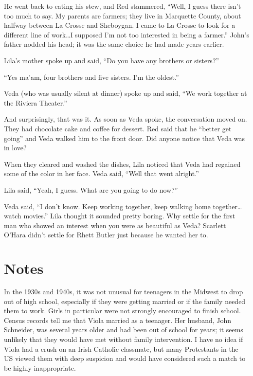 \documentclass[
  letterpaper,
]{book}
\begin{document}
He went back to eating his stew, and Red stammered, ``Well, I guess
there isn't too much to say. My parents are farmers; they live in
Marquette County, about halfway between La Crosse and Sheboygan. I came
to La Crosse to look for a different line of work\ldots I supposed I'm
not too interested in being a farmer.'' John's father nodded his head;
it was the same choice he had made years earlier.

Lila's mother spoke up and said, ``Do you have any brothers or
sisters?''

``Yes ma'am, four brothers and five sisters. I'm the oldest.''

Veda (who was usually silent at dinner) spoke up and said, ``We work
together at the Riviera Theater.''

And surprisingly, that was it. As soon as Veda spoke, the conversation
moved on. They had chocolate cake and coffee for dessert. Red said that
he ``better get going'' and Veda walked him to the front door. Did
anyone notice that Veda was in love?

When they cleared and washed the dishes, Lila noticed that Veda had
regained some of the color in her face. Veda said, ``Well that went
alright.''

Lila said, ``Yeah, I guess. What are you going to do now?''

Veda said, ``I don't know. Keep working together, keep walking home
together\ldots watch movies.'' Lila thought it sounded pretty boring.
Why settle for the first man who showed an interest when you were as
beautiful as Veda? Scarlett O'Hara didn't settle for Rhett Butler just
because he wanted her to.

\section{Notes}\label{notes-20}

In the 1930s and 1940s, it was not unusual for teenagers in the Midwest
to drop out of high school, especially if they were getting married or
if the family needed them to work. Girls in particular were not strongly
encouraged to finish school. Census records tell me that Viola married
as a teenager. Her husband, John Schneider, was several years older and
had been out of school for years; it seems unlikely that they would have
met without family intervention. I have no idea if Viola had a crush on
an Irish Catholic classmate, but many Protestants in the US viewed them
with deep suspicion and would have considered such a match to be highly
inappropriate.
\end{document}
